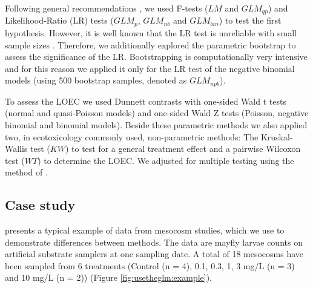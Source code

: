 Following general recommendations \citep{bolker_generalized_2009,faraway_extending_2006}, we used F-tests ($LM$ and $GLM_{qp}$) and Likeli\-hood-Ratio (LR) tests ($GLM_p$, $GLM_{nb}$ and $GLM_{bin}$) to test the first hypothesis.
However, it is well known that the LR test is unreliable with small sample sizes \citep{wilks_large-sample_1938}.
Therefore, we additionally explored the parametric bootstrap \citep{faraway_extending_2006} to assess the significance of the LR.
Bootstrapping is computationally very intensive and for this reason we applied it only for the LR test of the negative binomial models (using 500 bootstrap samples, denoted as $GLM_{npb}$).

To assess the LOEC we used Dunnett contrasts \citep{dunnett_multiple_1955} with one-sided Wald t tests (normal and quasi-Poisson models) and one-sided Wald Z tests (Poisson, negative binomial and binomial models).
Beside these parametric methods we also applied two, in ecotoxicology commonly used, non-parametric methods: The Kruskal-Wallis test  ($KW$) to test for a general treatment effect and a pairwise Wilcoxon test ($WT$) to determine the LOEC.
We adjusted for multiple testing using the method of \citet{holm_simple_1979}.


\subsection{Case study}
\label{ssec:usetheglm:case}
\citet{brock_minimum_2015} presents a typical example of data from mesocosm studies, which we use to demonstrate differences between methods.
The data are mayfly larvae counts on artificial substrate samplers at one sampling date. 
A total of 18 mesocosms have been sampled from 6 treatments (Control (n = 4), 0.1, 0.3, 1, 3 mg/L (n = 3) and 10 mg/L (n = 2)) (Figure \ref{fig:usetheglm:example}).

